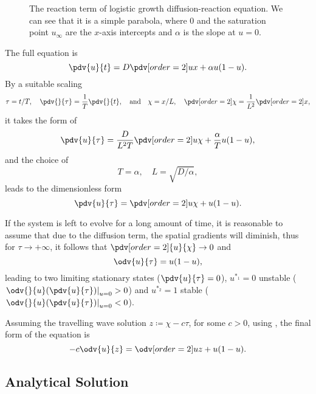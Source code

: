 \begin{figure}[htbp]
    \centering
    
    \caption{
        The reaction term of logistic growth diffusion-reaction equation.
        We can see that it is a simple parabola, where \(0\) and the saturation point \(u_{\infty}\) are the \(x\)-axis
            intercepts and \(\alpha\) is the slope at \(u=0\).
    }
    \label{fig:logistic-reaction-term}
\end{figure}

The full equation is \[
    \pdv{u}{t} = D\pdv[order={2}]{u}{x} + \alpha u (1 - u).
\]
By a suitable scaling \begin{equation*}
      \tau = t/T, \quad\pdv{}{\tau} = \frac{1}{T} \pdv{}{t}, \quad \text{and}\quad
      \chi = x/L,\quad\pdv[order={2}]{}{\chi} = \frac{1}{L^2}\pdv[order={2}]{}{x},
\end{equation*} it takes the form of \[
\pdv{u}{\tau} = \frac{D}{L^2T}\pdv[order={2}]{u}{\chi} + \frac{\alpha}{T} u(1-u),
\] and the choice of \[
    T = \alpha, \quad L = \sqrt{D/\alpha},
\] leads to the dimensionless form \begin{equation}
\pdv{u}{\tau} = \pdv[order={2}]{u}{\chi} + u(1-u).
\end{equation}

If the system is left to evolve for a long amount of time, it is reasonable to assume that due to the diffusion term,
    the spatial gradients will diminish, thus for \(\tau \to +\infty\), it follows that \(\pdv[order=2]{u}{\chi} \to 0\) 
    and \[
        \odv{u}{\tau} = u(1-u),
    \] leading to two limiting stationary states (\(\pdv{u}{\tau} = 0\)), \(u^{*_1}=0\) unstable
    (\(\left.\odv{}{u}(\pdv{u}{\tau})\right|_{u = 0} > 0\)) and \(u^{*_2}=1\) stable 
        (\(\left.\odv{}{u}(\pdv{u}{\tau})\right|_{u = 0} < 0\)).

Assuming the travelling wave solution \(z \coloneqq \chi - c \tau\), for some \(c > 0\), using ,
    the final form of the equation is \begin{equation}
        \label{eq:travelling-wave-odif-fisher-kpp}
        -c\odv{u}{z} = \odv[order={2}]{u}{z} + u(1-u).
    \end{equation}


\subsection{Analytical Solution}%
\label{sub:analytical_solution}


